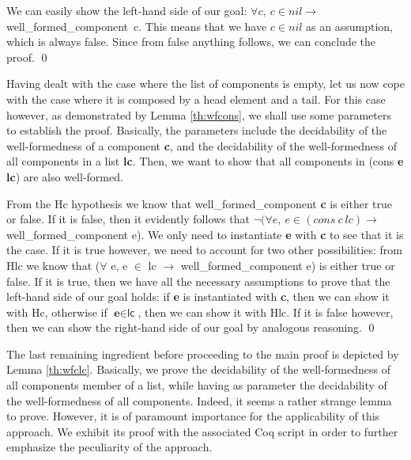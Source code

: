 		\begin{lemma} \label{th:wflnil} 
		
		
		We can easily show the left-hand side of our goal: 
		$\forall c,\ c \in nil \rightarrow$ well\_formed\_component\ c. This means that
		we have $c \in nil$ as an assumption, which is always false.				
		Since from false anything follows, we can conclude the proof. \qed
	\end{lemma}				


	\noindent Having dealt with the case where the list of \textsf{component}s is empty,
	let us now cope with  the case where it is composed by a head element and a tail.
	For this case however, as demonstrated by Lemma \ref{th:wfcons}, we shall use
	some parameters to establish the proof. Basically, the parameters include the
	decidability of the well-formedness of a \textsf{component} \textbf{c}, and the 
	decidability of the well-formedness of all \textsf{component}s in a list \textbf{lc}.
	Then, we want to show that all \textsf{component}s in (\textsf{cons} \textbf{e} \textbf{lc})
	are also well-formed. 

		\begin{lemma} \label{th:wfcons} 
				
			
			From the \textsf{Hc} hypothesis we know that well\_formed\_component \textbf{c}
			is either true or false. If it is false, then it evidently follows that $\neg (\forall e,\
			e \in (cons\ c\ lc) \rightarrow$ well\_formed\_component e). We only need to
			instantiate \textbf{e} with \textbf{c} to see that it is the case. If it is true however,
			we need to account for two other possibilities: from \textsf{Hlc} we know that ($\forall$ e, 
			e $\in$ lc $\rightarrow$ well\_formed\_component e) is either true or false.
			If it is true, then we have all the necessary assumptions to prove that
			the left-hand side of our goal holds:
			if \textbf{e} is instantiated with \textbf{c}, then we can show it with
			\textsf{Hc}, otherwise if $\textbf{e} \in \textsf{lc}$, then we can show it
			with \textsf{Hlc}. If it is false however, then we can show the right-hand side
			of our goal by analogous reasoning. \qed
	\end{lemma}	
	
		 The last remaining ingredient before proceeding to the main proof is
	depicted by Lemma \ref{th:wfclc}. Basically, we prove the decidability of the well-formedness of 
	all \textsf{component}s member of a list, while having as parameter the 
	decidability of the well-formedness of all \textsf{component}s. Indeed, 
	it seems a rather strange lemma to prove. However, it is of paramount 
	importance for the applicability of this approach. 
	We exhibit its proof with the associated Coq script in order
	to further emphasize the peculiarity of the approach. 
					
